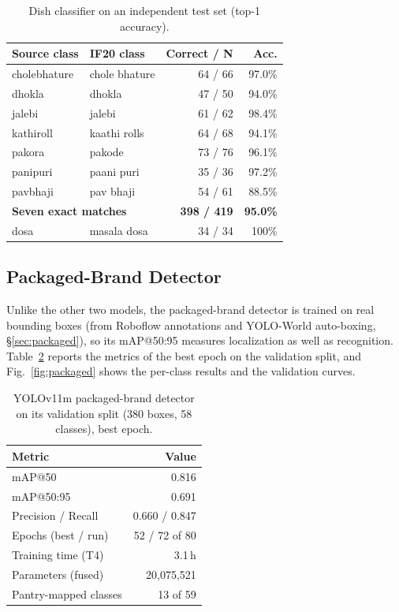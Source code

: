 \documentclass[journal]{IEEEtran}
\begin{document}
\begin{table}[!tb]
\caption{Dish classifier on an independent test set (top-1 accuracy).}
\label{tab:crossdata}
\centering
\footnotesize
\setlength{\tabcolsep}{4pt}
\begin{tabular}{l l r r}
\toprule
\textbf{Source class} & \textbf{IF20 class} & \textbf{Correct / N} & \textbf{Acc.} \\
\midrule
cholebhature & chole bhature & 64 / 66 & 97.0\% \\
dhokla       & dhokla        & 47 / 50 & 94.0\% \\
jalebi       & jalebi        & 61 / 62 & 98.4\% \\
kathiroll    & kaathi rolls  & 64 / 68 & 94.1\% \\
pakora       & pakode        & 73 / 76 & 96.1\% \\
panipuri     & paani puri    & 35 / 36 & 97.2\% \\
pavbhaji     & pav bhaji     & 54 / 61 & 88.5\% \\
\midrule
\multicolumn{2}{l}{\textbf{Seven exact matches}} & \textbf{398 / 419} & \textbf{95.0\%} \\
dosa         & masala dosa   & 34 / 34 & 100\% \\
\bottomrule
\end{tabular}
\end{table}

\subsection{Packaged-Brand Detector}
\label{sec:packaged-results}

Unlike the other two models, the packaged-brand detector is trained
on real bounding boxes (from Roboflow annotations and YOLO-World
auto-boxing, \S\ref{sec:packaged}), so its mAP@50:95 measures
localization as well as recognition. Table~\ref{tab:packaged}
reports the metrics of the best epoch on the validation split, and
Fig.~\ref{fig:packaged} shows the per-class results and the
validation curves.

\begin{table}[!tb]
\caption{YOLOv11m packaged-brand detector on its validation split
(380 boxes, 58 classes), best epoch.}
\label{tab:packaged}
\centering
\footnotesize
\begin{tabular}{lr}
\toprule
\textbf{Metric} & \textbf{Value} \\
\midrule
mAP@50                 & 0.816 \\
mAP@50:95              & 0.691 \\
Precision / Recall     & 0.660 / 0.847 \\
Epochs (best / run)    & 52 / 72 of 80 \\
Training time (T4)     & 3.1\,h \\
Parameters (fused)     & 20{,}075{,}521 \\
Pantry-mapped classes  & 13 of 59 \\
\bottomrule
\end{tabular}
\end{table}
\end{document}
